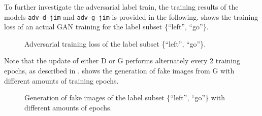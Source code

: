 \FloatBarrier
\noindent
To further investigate the adversarial label train, the training results of the models \texttt{adv-d-jim} and \texttt{adv-g-jim} is provided in the following.
 shows the training loss of an actual GAN training for the label subset \{\enquote{left}, \enquote{go}\}.
\begin{figure}[!ht]
  \centering
  \quad
  \caption{Adversarial training loss of the label subset \{\enquote{left}, \enquote{go}\}.}
  \label{fig:nn_adv_loss_label}
\end{figure}
\FloatBarrier
\noindent
Note that the update of either D or G performs alternately every 2 training epochs, as described in .
 shows the generation of fake images from G with different amounts of training epochs.
\begin{figure}[!ht]
  \centering
  \quad
  \caption{Generation of fake images of the label subset \{\enquote{left}, \enquote{go}\} with different amounts of epochs.}
  \label{fig:nn_adv_fakes_label}
\end{figure}
